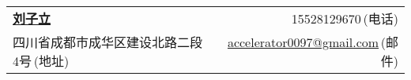 \newcommand{\myheader}{
\begin{tabular*}{\textwidth}{l@{\extracolsep{\fill}}r}
  \textbf{\href{https://github.com/liuzili97}{\LARGE 刘子立}} & 15528129670$\,${\color{labelgrey}(电话)} \\%
  四川省成都市成华区建设北路二段4号$\,${\color{labelgrey}(地址)} & 
  \href{mailto:accelerator0097@gmail.com}{accelerator0097@gmail.com}$\,${\color{labelgrey}(邮件)} \\
 
  \end{tabular*}\\\vspace{0.1in}}

\myheader